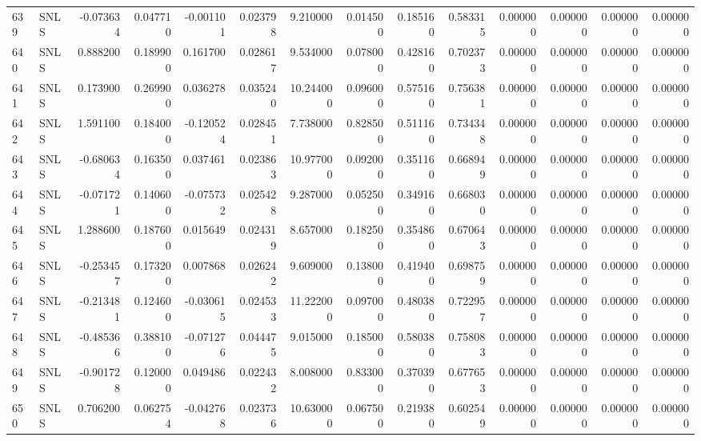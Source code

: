 \begin{tabular}{llrrrrrrrrrrrr}
639 &   SNLS & -0.073634 &      0.047710 & -0.001101 &    0.023798 &   9.210000 &      0.014500 &   0.185160 &  0.583315 &  0.000000 &   0.000000 &     0.000000 &     0.000000 \\
640 &   SNLS &  0.888200 &      0.189900 &  0.161700 &    0.028617 &   9.534000 &      0.078000 &   0.428160 &  0.702373 &  0.000000 &   0.000000 &     0.000000 &     0.000000 \\
641 &   SNLS &  0.173900 &      0.269900 &  0.036278 &    0.035240 &  10.244000 &      0.096000 &   0.575160 &  0.756381 &  0.000000 &   0.000000 &     0.000000 &     0.000000 \\
642 &   SNLS &  1.591100 &      0.184000 & -0.120524 &    0.028451 &   7.738000 &      0.828500 &   0.511160 &  0.734348 &  0.000000 &   0.000000 &     0.000000 &     0.000000 \\
643 &   SNLS & -0.680634 &      0.163500 &  0.037461 &    0.023863 &  10.977000 &      0.092000 &   0.351160 &  0.668949 &  0.000000 &   0.000000 &     0.000000 &     0.000000 \\
644 &   SNLS & -0.071721 &      0.140600 & -0.075732 &    0.025428 &   9.287000 &      0.052500 &   0.349160 &  0.668030 &  0.000000 &   0.000000 &     0.000000 &     0.000000 \\
645 &   SNLS &  1.288600 &      0.187600 &  0.015649 &    0.024319 &   8.657000 &      0.182500 &   0.354860 &  0.670643 &  0.000000 &   0.000000 &     0.000000 &     0.000000 \\
646 &   SNLS & -0.253457 &      0.173200 &  0.007868 &    0.026242 &   9.609000 &      0.138000 &   0.419400 &  0.698759 &  0.000000 &   0.000000 &     0.000000 &     0.000000 \\
647 &   SNLS & -0.213481 &      0.124600 & -0.030615 &    0.024533 &  11.222000 &      0.097000 &   0.480380 &  0.722957 &  0.000000 &   0.000000 &     0.000000 &     0.000000 \\
648 &   SNLS & -0.485366 &      0.388100 & -0.071276 &    0.044475 &   9.015000 &      0.185000 &   0.580380 &  0.758083 &  0.000000 &   0.000000 &     0.000000 &     0.000000 \\
649 &   SNLS & -0.901728 &      0.120000 &  0.049486 &    0.022432 &   8.008000 &      0.833000 &   0.370390 &  0.677653 &  0.000000 &   0.000000 &     0.000000 &     0.000000 \\
650 &   SNLS &  0.706200 &      0.062754 & -0.042768 &    0.023736 &  10.630000 &      0.067500 &   0.219380 &  0.602549 &  0.000000 &   0.000000 &     0.000000 &     0.000000 \\

\end{tabular}
